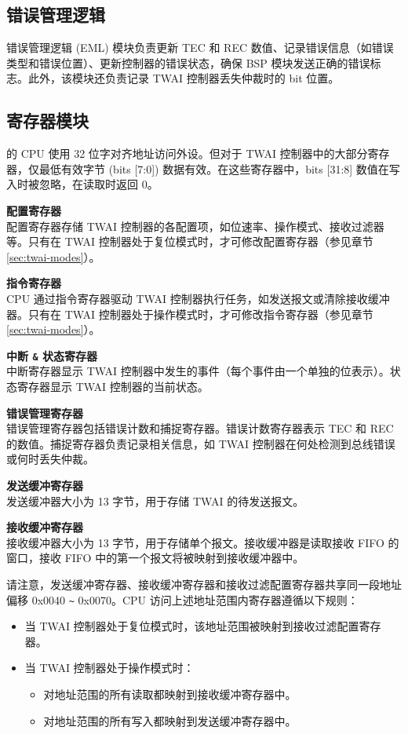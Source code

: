 \documentclass[main\_\_CN.tex]{subfiles}
\begin{document}
\subsection{错误管理逻辑}
错误管理逻辑 (EML) 模块负责更新 TEC 和 REC 数值、记录错误信息（如错误类型和错误位置）、更新控制器的错误状态，确保 BSP 模块发送正确的错误标志。此外，该模块还负责记录 TWAI 控制器丢失仲裁时的 bit 位置。

\subsection{寄存器模块}
\chipname{} 的 CPU 使用 32 位字对齐地址访问外设。但对于 TWAI 控制器中的大部分寄存器，仅最低有效字节 (bits [7:0]) 数据有效。在这些寄存器中，bits [31:8] 数值在写入时被忽略，在读取时返回 0。

{\bfseries 配置寄存器}\\
配置寄存器存储 TWAI 控制器的各配置项，如位速率、操作模式、接收过滤器等。只有在 TWAI 控制器处于复位模式时，才可修改配置寄存器（参见章节 \ref{sec:twai-modes}）。

{\bfseries 指令寄存器}\\
CPU 通过指令寄存器驱动 TWAI 控制器执行任务，如发送报文或清除接收缓冲器。只有在 TWAI 控制器处于操作模式时，才可修改指令寄存器（参见章节 \ref{sec:twai-modes}）。

{\bfseries 中断 \verb+&+ 状态寄存器}\\
中断寄存器显示 TWAI 控制器中发生的事件（每个事件由一个单独的位表示）。状态寄存器显示 TWAI 控制器的当前状态。

{\bfseries 错误管理寄存器}\\
错误管理寄存器包括错误计数和捕捉寄存器。错误计数寄存器表示 TEC 和 REC 的数值。捕捉寄存器负责记录相关信息，如 TWAI 控制器在何处检测到总线错误或何时丢失仲裁。

{\bfseries 发送缓冲寄存器}\\
发送缓冲器大小为 13 字节，用于存储 TWAI 的待发送报文。

{\bfseries 接收缓冲寄存器}\\
接收缓冲器大小为 13 字节，用于存储单个报文。接收缓冲器是读取接收 FIFO 的窗口，接收 FIFO 中的第一个报文将被映射到接收缓冲器中。

请注意，发送缓冲寄存器、接收缓冲寄存器和接收过滤配置寄存器共享同一段地址偏移 0x0040 \verb+~+ 0x0070。CPU 访问上述地址范围内寄存器遵循以下规则：

\begin{itemize}
    \item 当 TWAI 控制器处于复位模式时，该地址范围被映射到接收过滤配置寄存器。
    \item 当 TWAI 控制器处于操作模式时：
    \begin{itemize}
        \item 对地址范围的所有读取都映射到接收缓冲寄存器中。
        \item 对地址范围的所有写入都映射到发送缓冲寄存器中。
    \end{itemize}
\end{itemize}
\end{document}
